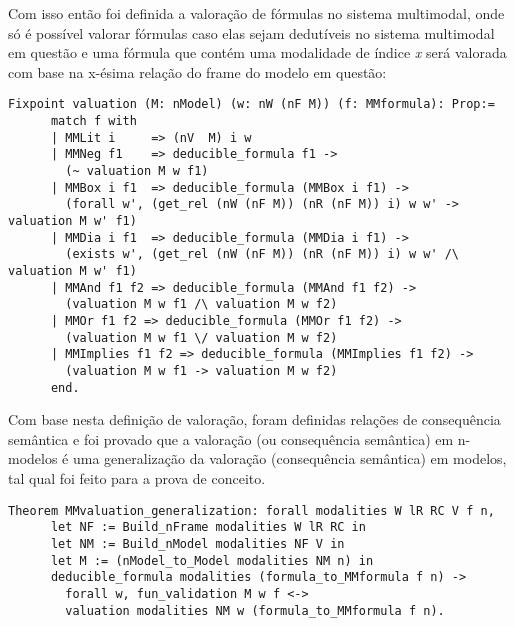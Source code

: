       Com isso então foi definida a valoração de fórmulas no sistema multimodal, onde só é possível valorar fórmulas caso elas sejam dedutíveis no sistema multimodal em questão
      e uma fórmula que contém uma modalidade de índice \textit{x} será valorada com base na x-ésima relação do frame do modelo em questão:
      \begin{lstlisting}[language=coq]
    Fixpoint valuation (M: nModel) (w: nW (nF M)) (f: MMformula): Prop:=
      match f with
      | MMLit i     => (nV  M) i w
      | MMNeg f1    => deducible_formula f1 ->
        (~ valuation M w f1)
      | MMBox i f1  => deducible_formula (MMBox i f1) ->
        (forall w', (get_rel (nW (nF M)) (nR (nF M)) i) w w' -> valuation M w' f1)
      | MMDia i f1  => deducible_formula (MMDia i f1) ->
        (exists w', (get_rel (nW (nF M)) (nR (nF M)) i) w w' /\ valuation M w' f1)
      | MMAnd f1 f2 => deducible_formula (MMAnd f1 f2) ->
        (valuation M w f1 /\ valuation M w f2)
      | MMOr f1 f2 => deducible_formula (MMOr f1 f2) ->
        (valuation M w f1 \/ valuation M w f2)
      | MMImplies f1 f2 => deducible_formula (MMImplies f1 f2) ->
        (valuation M w f1 -> valuation M w f2)
      end.
      \end{lstlisting}

      Com base nesta definição de valoração, foram definidas relações de consequência semântica e foi provado que a valoração (ou consequência semântica) em n-modelos é uma generalização da
      valoração (consequência semântica) em modelos, tal qual foi feito para a prova de conceito.
      \begin{lstlisting}[language=coq]
    Theorem MMvaluation_generalization: forall modalities W lR RC V f n,
      let NF := Build_nFrame modalities W lR RC in
      let NM := Build_nModel modalities NF V in
      let M := (nModel_to_Model modalities NM n) in
      deducible_formula modalities (formula_to_MMformula f n) ->
        forall w, fun_validation M w f <->
        valuation modalities NM w (formula_to_MMformula f n).
      \end{lstlisting}


